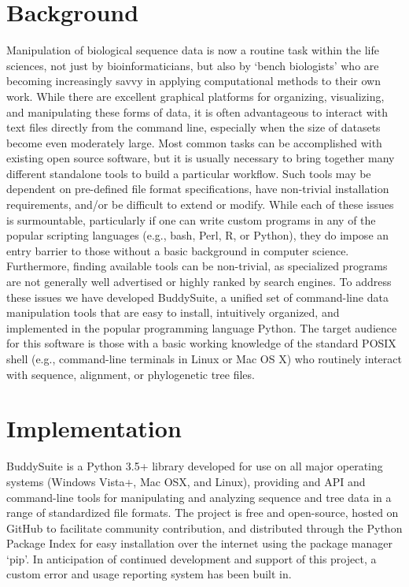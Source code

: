 \documentclass[twocolumn]{bmcart}%
\begin{document}
\section*{Background}
Manipulation of biological sequence data is now a routine task within the life sciences, not just by bioinformaticians, but also by `bench biologists' who are becoming increasingly savvy in applying computational methods to their own work. While there are excellent graphical platforms for organizing, visualizing, and manipulating these forms of data, it is often advantageous to interact with text files directly from the command line, especially when the size of datasets become even moderately large. Most common tasks can be accomplished with existing open source software, but it is usually necessary to bring together many different standalone tools to build a particular workflow. Such tools may be dependent on pre-defined file format specifications, have non-trivial installation requirements, and/or be difficult to extend or modify. While each of these issues is surmountable, particularly if one can write custom programs in any of the popular scripting languages (e.g., bash, Perl, R, or Python), they do impose an entry barrier to those without a basic background in computer science. Furthermore, finding available tools can be non-trivial, as specialized programs are not generally well advertised or highly ranked by search engines. To address these issues we have developed BuddySuite, a unified set of command-line data manipulation tools that are easy to install, intuitively organized, and implemented in the popular programming language Python. The target audience for this software is those with a basic working knowledge of the standard POSIX shell (e.g., command-line terminals in Linux or Mac OS X) who routinely interact with sequence, alignment, or phylogenetic tree files.


\section*{Implementation}
BuddySuite is a Python 3.5+ library developed for use on all major operating systems (Windows Vista+, Mac OSX, and Linux), providing and API and command-line tools for manipulating and analyzing sequence and tree data in a range of standardized file formats. The project is free and open-source, hosted on GitHub to facilitate community contribution, and distributed through the Python Package Index for easy installation over the internet using the package manager `pip'. In anticipation of continued development and support of this project, a custom error and usage reporting system has been built in.
\end{document}
